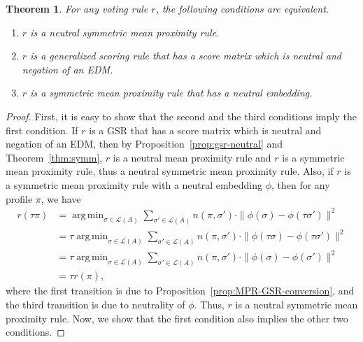 \documentclass[10pt,letterpaper]{article}
\newcommand{\calL}{{\mathcal{L}}}
\newcommand{\rank}{{\calL(A)}}
\DeclareMathOperator*{\argmin}{arg\,min}
\newtheorem{theorem}{Theorem}
\begin{document}
\begin{theorem}
For any voting rule $r$, the following conditions are equivalent.
\begin{enumerate}
\item $r$ is a neutral symmetric mean proximity rule.
\item $r$ is a generalized scoring rule that has a score matrix which is neutral and negation of an EDM. 
\item $r$ is a symmetric mean proximity rule that has a neutral embedding.
\end{enumerate}
\label{thm:neutral-smpr}
\end{theorem}
\begin{proof}
First, it is easy to show that the second and the third conditions imply the first condition. If $r$ is a GSR that has a score matrix which is neutral and negation of an EDM, then by Proposition~\ref{prop:gsr-neutral} and Theorem~\ref{thm:symm}, $r$ is a neutral mean proximity rule and $r$ is a symmetric mean proximity rule, thus a neutral symmetric mean proximity rule. Also, if $r$ is a symmetric mean proximity rule with a neutral embedding $\phi$, then for any profile $\pi$, we have 
\begin{align*}
r(\tau \pi) &= \argmin_{\sigma \in \rank} \sum_{\sigma' \in \rank} n(\pi,\sigma') \cdot \|\phi(\sigma)-\phi(\tau \sigma')\|^2 \\
&= \tau \argmin_{\sigma \in \rank} \sum_{\sigma' \in \rank} n(\pi,\sigma') \cdot \|\phi(\tau \sigma)-\phi(\tau \sigma')\|^2 \\
&= \tau \argmin_{\sigma \in \rank} \sum_{\sigma' \in \rank} n(\pi,\sigma') \cdot \|\phi(\sigma)-\phi(\sigma')\|^2 \\
&= \tau r(\pi),
\end{align*}
where the first transition is due to Proposition~\ref{prop:MPR-GSR-conversion}, and the third transition is due to neutrality of $\phi$. Thus, $r$ is a neutral symmetric mean proximity rule. Now, we show that the first condition also implies the other two conditions.


\end{proof}
\end{document}
